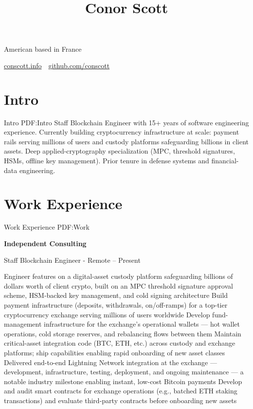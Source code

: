 \documentclass[a4paper,10pt,oneside]{article}
\begin{document}

\title{Conor Scott}

\begin{subtitle}
American based in France
\par
\href{https://conscott.info} {conscott.info}
\,\BulletSymbol\,
\href{https://github.com/conscott}{github.com/conscott}
\end{subtitle}
\begin{body}


\section
{Intro}
{Intro}
{PDF:Intro}
Staff Blockchain Engineer with 15+ years of software engineering experience. Currently building cryptocurrency infrastructure at scale: payment rails serving millions of users and custody platforms safeguarding billions in client assets. Deep applied-cryptography specialization (MPC, threshold signatures, HSMs, offline key management). Prior tenure in defense systems and financial-data engineering.

\section
{Work Experience}
{Work Experience}
{PDF:Work}

\EntryGap

\textbf{Independent Consulting}
\par
Staff Blockchain Engineer - Remote
\hfill
{} -- Present
\begin{detail}
\BulletItem Engineer features on a digital-asset custody platform safeguarding billions of dollars worth of client crypto, built on an MPC threshold signature approval scheme, HSM-backed key management, and cold signing architecture
\BulletItem Build payment infrastructure (deposits, withdrawals, on/off-ramps) for a top-tier cryptocurrency exchange serving millions of users worldwide
\BulletItem Develop fund-management infrastructure for the exchange's operational wallets --- hot wallet operations, cold storage reserves, and rebalancing flows between them
\BulletItem Maintain critical-asset integration code (BTC, ETH, etc.) across custody and exchange platforms; ship capabilities enabling rapid onboarding of new asset classes
\BulletItem Delivered end-to-end Lightning Network integration at the exchange --- development, infrastructure, testing, deployment, and ongoing maintenance --- a notable industry milestone enabling instant, low-cost Bitcoin payments
\BulletItem Develop and audit smart contracts for exchange operations (e.g., batched ETH staking transactions) and evaluate third-party contracts before onboarding new assets
\end{detail}


\end{body}
\end{document}
